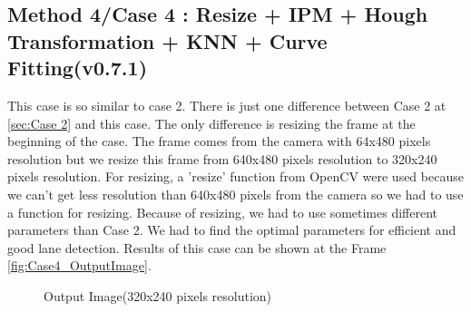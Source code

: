 \subsection{Method 4/Case 4 : Resize + IPM + Hough Transformation + KNN + Curve Fitting(v0.7.1)}\label{sec:Case 4}

This case is so similar to case 2. There is just one difference between Case 2 at \ref{sec:Case 2} and this case. The only difference is resizing the frame at the beginning of the case. The frame comes from the camera with 64x480 pixels resolution but we resize this frame from 640x480 pixels resolution to 320x240 pixels resolution. For resizing, a 'resize' function from OpenCV were used because we can't get less resolution than 640x480 pixels from the camera so we had to use a function for resizing. Because of resizing, we had to use sometimes different parameters than Case 2. We had to find the optimal parameters for efficient and good lane detection. Results of this case can be shown at the Frame \ref{fig:Case4_OutputImage}.

\begin{figure}[H]
  \centering
  \caption{Output Image(320x240 pixels resolution)}
\end{figure}

%
